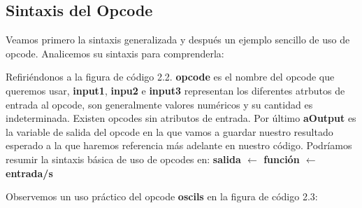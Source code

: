 \subsection{Sintaxis del Opcode}\label{sec:SyntaxOpcodes}

Veamos primero la sintaxis generalizada y después un ejemplo sencillo de uso de opcode. Analicemos su sintaxis para comprenderla:


Refiriéndonos a la figura de código 2.2. \textbf{opcode} es el nombre del opcode que queremos usar, \textbf{input1}, \textbf{inpu2} e \textbf{input3} representan los diferentes atrbutos de entrada al opcode, son generalmente valores numéricos y su cantidad es indeterminada. Existen opcodes sin atributos de entrada. Por último \textbf{aOutput} es la variable de salida del opcode en la que vamos a guardar nuestro resultado esperado a la que haremos referencia más adelante en nuestro código.
Podríamos resumir la sintaxis básica de uso de opcodes en: \textbf{salida $\leftarrow$ función $\leftarrow$ entrada/s} 


Observemos un uso práctico del opcode \textbf{oscils} en la figura de código 2.3:

